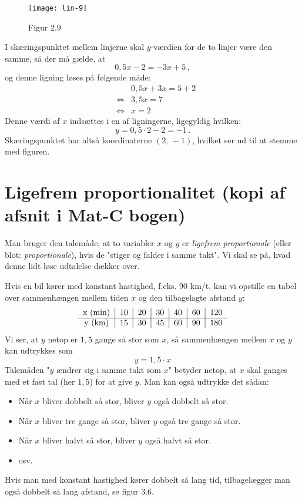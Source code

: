 \documentclass[12pt,oneside,a4paper]{article}
\newcommand{\bas}{\begin{eqnarray*}}
\newcommand{\eas}{\end{eqnarray*}}
\begin{document}
\begin{figure}[H]
    \centering
    \texttt{[image: lin-9]}
    \caption{Figur 2.9}
    \label{fig6}
\end{figure}

I skæringspunktet mellem linjerne skal $y$-værdien for de to linjer være den
samme, så der må gælde, at
\[
0,5x-2 = -3x+5 \,,
\]
og denne ligning løses på følgende måde:
\bas
&& 0,5x+3x=5+2\\
&\iff& 3,5x=7\\
&\iff& x=2
\eas
Denne værdi af $x$ indsættes i en af ligningerne, ligegyldig hvilken:
\[
y=0,5\cdot2-2=-1 \,.
\]
Skæringspunktet har altså koordinaterne $(2,\,-1)$, hvilket ser ud til at
stemme med figuren.



\section{Ligefrem proportionalitet (kopi af afsnit i Mat-C bogen)}
Man bruger den talemåde, at to variabler $x$ og $y$ er {\em ligefrem
proportionale} (eller blot: {\em proportionale}), hvis de "stiger og falder i
samme takt". Vi skal se på, hvad denne lidt løse udtalelse dækker over.

Hvis en bil kører med konstant hastighed, f.eks. 90 km/t, kan vi opstille en
tabel over sammenhængen mellem tiden $x$ og den tilbagelagte afstand $y$:
\[
\begin{tabular}{c|c|c|c|c|c|c}
    x ({\rm min}) & 10 & 20 & 30 & 40 & 60 & 120 \\
    \hline
    y ({\rm km})  & 15 & 30 & 45 & 60 & 90 & 180  
\end{tabular}
\]
Vi ser, at $y$ netop er $1,5$ gange så stor som $x$, så sammenhængen mellem $x$
og $y$ kan udtrykkes som
\[
y = 1,5\cdot x
\]
Talemåden "$y$ ændrer sig i samme takt som $x$" betyder netop, at $x$ skal
ganges med et fast tal (her $1,5$) for at give $y$. Man kan også udtrykke det
sådan:
\begin{itemize}
    \item Når $x$ bliver dobbelt så stor, bliver $y$ også dobbelt så stor.
    \item Når $x$ bliver tre gange så stor, bliver $y$ også tre gange så stor.
    \item Når $x$ bliver halvt så stor, bliver $y$ også halvt så stor.
    \item osv.
\end{itemize}
Hvis man med konstant hastighed kører dobbelt så lang tid, tilbagelægger man
også dobbelt så lang afstand, se figur 3.6.
\end{document}
